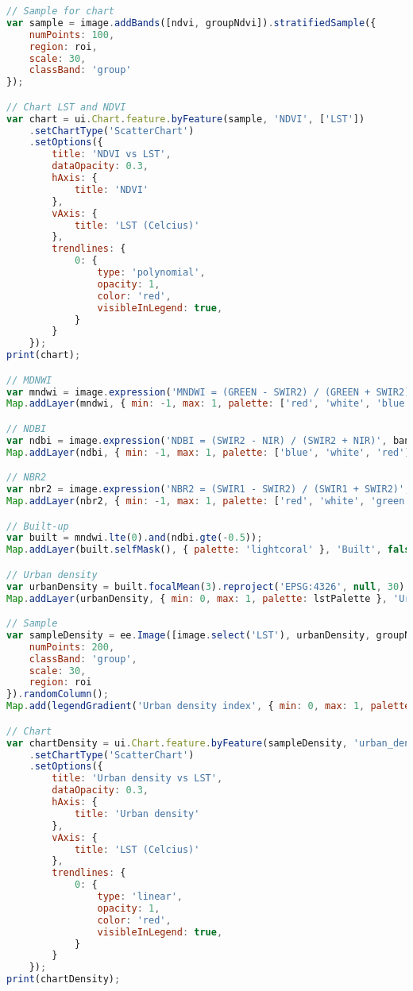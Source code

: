 \begin{lstlisting}[language=JavaScript, label={code:urbanDensity}, caption={GEE Script to model urban density and LST}]
// Sample for chart
var sample = image.addBands([ndvi, groupNdvi]).stratifiedSample({
	numPoints: 100,
	region: roi,
	scale: 30,
	classBand: 'group'
});

// Chart LST and NDVI
var chart = ui.Chart.feature.byFeature(sample, 'NDVI', ['LST'])
	.setChartType('ScatterChart')
	.setOptions({
		title: 'NDVI vs LST',
		dataOpacity: 0.3,
		hAxis: {
			title: 'NDVI'
		},
		vAxis: {
			title: 'LST (Celcius)'
		},
		trendlines: {
			0: {
				type: 'polynomial',
				opacity: 1,
				color: 'red',
				visibleInLegend: true,
			}
		}
	});
print(chart);

// MDNWI
var mndwi = image.expression('MNDWI = (GREEN - SWIR2) / (GREEN + SWIR2)', bandMap);
Map.addLayer(mndwi, { min: -1, max: 1, palette: ['red', 'white', 'blue']}, 'MNDWI', false);

// NDBI
var ndbi = image.expression('NDBI = (SWIR2 - NIR) / (SWIR2 + NIR)', bandMap);
Map.addLayer(ndbi, { min: -1, max: 1, palette: ['blue', 'white', 'red']}, 'NDBI', false);

// NBR2
var nbr2 = image.expression('NBR2 = (SWIR1 - SWIR2) / (SWIR1 + SWIR2)', bandMap);
Map.addLayer(nbr2, { min: -1, max: 1, palette: ['red', 'white', 'green']}, 'NBR2', false);

// Built-up
var built = mndwi.lte(0).and(ndbi.gte(-0.5));
Map.addLayer(built.selfMask(), { palette: 'lightcoral' }, 'Built', false);

// Urban density
var urbanDensity = built.focalMean(3).reproject('EPSG:4326', null, 30).rename('urban_density');
Map.addLayer(urbanDensity, { min: 0, max: 1, palette: lstPalette }, 'Urban density');

// Sample
var sampleDensity = ee.Image([image.select('LST'), urbanDensity, groupNdvi]).stratifiedSample({
	numPoints: 200,
	classBand: 'group',
	scale: 30,
	region: roi
}).randomColumn();
Map.add(legendGradient('Urban density index', { min: 0, max: 1, palette: lstPalette}, 'bottom-right'));

// Chart
var chartDensity = ui.Chart.feature.byFeature(sampleDensity, 'urban_density', ['LST'])
	.setChartType('ScatterChart')
	.setOptions({
		title: 'Urban density vs LST',
		dataOpacity: 0.3,
		hAxis: {
			title: 'Urban density'
		},
		vAxis: {
			title: 'LST (Celcius)'
		},
		trendlines: {
			0: {
				type: 'linear',
				opacity: 1,
				color: 'red',
				visibleInLegend: true,
			}
		}
	});
print(chartDensity);


\end{lstlisting}
